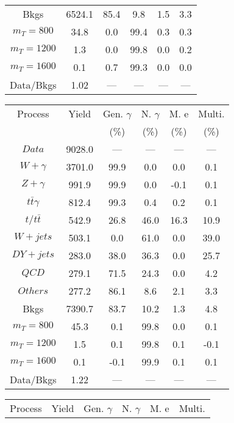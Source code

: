 \begin{figure}
\begin{minipage}[c]{0.32\textwidth}
{\begin{tabular}{cccccc}
Bkgs &  6524.1 &  85.4 &  9.8 &  1.5 &  3.3\\
$ m_{T} = 800 $ &  34.8 &  0.0 &  99.4 &  0.3 &  0.3\\
$ m_{T} = 1200 $ &  1.3 &  0.0 &  99.8 &  0.0 &  0.2\\
$ m_{T} = 1600 $ &  0.1 &  0.7 &  99.3 &  0.0 &  0.0\\
Data/Bkgs &  1.02 &  --- &  --- &  --- &  ---\\
\hline
\end{tabular}
}
\end{minipage}
\begin{minipage}[c]{0.32\textwidth}
\centering
\tiny{
\begin{tabular}{cccccc}
\hline
Process & Yield & Gen. $\gamma$ & N. $\gamma$ & M. e & Multi. \\
 &  & (\%) & (\%) & (\%) & (\%)  \\
\hline
                                                                      $ Data $ &  9028.0 &  --- &  --- &  --- &  ---\\
$ W+\gamma $ &  3701.0 &  99.9 &  0.0 &  0.0 &  0.1\\
$ Z+\gamma $ &  991.9 &  99.9 &  0.0 &  -0.1 &  0.1\\
$ t\bar{t}\gamma $ &  812.4 &  99.3 &  0.4 &  0.2 &  0.1\\
$ t/t\bar{t} $ &  542.9 &  26.8 &  46.0 &  16.3 &  10.9\\
$ W+jets $ &  503.1 &  0.0 &  61.0 &  0.0 &  39.0\\
$ DY+jets $ &  283.0 &  38.0 &  36.3 &  0.0 &  25.7\\
$ QCD $ &  279.1 &  71.5 &  24.3 &  0.0 &  4.2\\
$ Others $ &  277.2 &  86.1 &  8.6 &  2.1 &  3.3\\
Bkgs &  7390.7 &  83.7 &  10.2 &  1.3 &  4.8\\
$ m_{T} = 800 $ &  45.3 &  0.1 &  99.8 &  0.0 &  0.1\\
$ m_{T} = 1200 $ &  1.5 &  0.1 &  99.8 &  0.1 &  -0.1\\
$ m_{T} = 1600 $ &  0.1 &  -0.1 &  99.9 &  0.1 &  0.1\\
Data/Bkgs &  1.22 &  --- &  --- &  --- &  ---\\
\hline
\end{tabular}
}
\end{minipage}
\begin{minipage}[c]{0.32\textwidth}
\centering
\tiny{
\begin{tabular}{cccccc}
\hline
Process & Yield & Gen. $\gamma$ & N. $\gamma$ & M. e & Multi. \\

\end{tabular}}
\end{minipage}
\end{figure}
